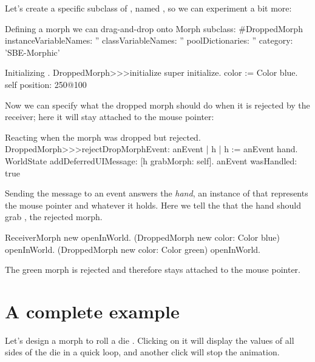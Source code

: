 \documentclass[a4paper,10pt,twoside]{book}
\begin{document}

Let's create a specific subclass of , named , so we can experiment a bit more:

\begin{classdef}{Defining a morph we can drag-and-drop onto }
Morph subclass: #DroppedMorph
	instanceVariableNames: ''
	classVariableNames: ''
	poolDictionaries: ''
	category: 'SBE-Morphic'
\end{classdef}

\begin{method}{Initializing .}
DroppedMorph>>>initialize
	super initialize.
	color := Color blue.
	self position: 250@100
\end{method}

Now we can specify what the dropped morph should do when it is rejected by the receiver; here it will stay attached to the mouse pointer:
\begin{method}{Reacting when the morph was dropped but rejected.}
DroppedMorph>>>rejectDropMorphEvent: anEvent
	| h |
	h := anEvent hand.
	WorldState
		addDeferredUIMessage: [h grabMorph: self].
	anEvent wasHandled: true
\end{method}

Sending the  message to an event answers the \emph{hand}, an instance of  that represents the mouse pointer and whatever it holds.
Here we tell the  that the hand should grab , the rejected morph.

\begin{code}{}
ReceiverMorph new openInWorld.
(DroppedMorph new color: Color blue) openInWorld.
(DroppedMorph new color: Color green) openInWorld.
\end{code}
\noindent
The green morph is rejected and therefore stays attached to the mouse pointer.

\section{A complete example}

Let's design a morph to roll a die%
.
Clicking on it will display the values of all sides of the die in a quick loop, and another click will stop the animation.
\end{document}
